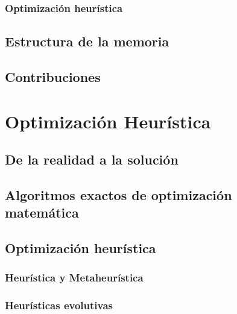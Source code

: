 \documentclass[12pt,a4paper]{book}
\begin{document}
\subsection{Optimización heurística} \label{Subsubsec: 1_2_4}



\section{Estructura de la memoria} \label{Subsubsec: 1_3}
  


\section{Contribuciones} \label{Subsec: 1_4}




\chapter{Optimización Heurística} \label{Capitulo_2}


 

\section{De la realidad a la solución} \label{Subsec: 3_1}



\section{Algoritmos exactos de optimización matemática} \label{Subsec: 3_2}



\section{Optimización heurística} \label{Subsec: 3_3}

\subsection{Heurística y Metaheurística}

\subsection{Heurísticas evolutivas} \label{Subsubsec: 3_3_2}
\end{document}
